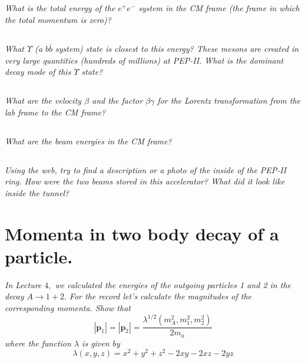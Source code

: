 \documentclass{article}
\begin{document}
\subsection{}
\textit{What is the total energy of the $e^{+} e^{-}$ system in the CM frame (the frame in which the total momentum is zero)?}

\subsection{}
\textit{What $\Upsilon$ (a $b \bar{b}$ system) state is closest to this energy? These mesons are created in very large quantities (hundreds of millions) at PEP-II. What is the dominant decay mode of this $\Upsilon$ state?}

\subsection{}
\textit{What are the velocity $\beta$ and the factor $\beta \gamma$ for the Lorentz transformation from the lab frame to the CM frame?}


\subsection{}
\textit{What are the beam energies in the CM frame?}


\subsection{}
\textit{Using the web, try to find a description or a photo of the inside of the PEP-II ring. How were the two beams stored in this accelerator? What did it look like inside the tunnel?}



\newpage


\section{Momenta in two body decay of a particle. }
\textit{In Lecture $4,$ we calculated the energies of the outgoing particles 1 and 2 in the decay $A \rightarrow 1+2 .$ For the record let's calculate the magnitudes of the corresponding momenta. Show that
$$
\left|\mathbf{p}_{1}\right|=\left|\mathbf{p}_{2}\right|=\frac{\lambda^{1 / 2}\left(m_{A}^{2}, m_{1}^{2}, m_{2}^{2}\right)}{2 m_{a}}
$$
where the function $\lambda$ is given by
$$
\lambda(x, y, z)=x^{2}+y^{2}+z^{2}-2 x y-2 x z-2 y z
$$}

\newpage
\end{document}
